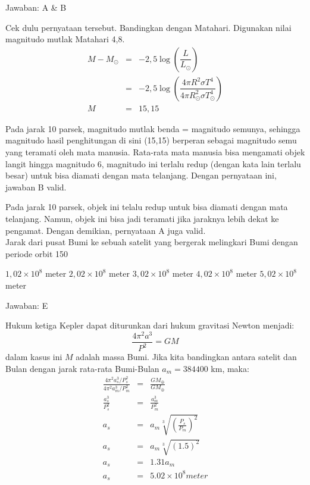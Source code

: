 \documentclass[11pt,fleqn]{exam}
\begin{document}
\begin{questions}
Jawaban: A \& B

Cek dulu pernyataan tersebut. Bandingkan dengan Matahari. Digunakan nilai magnitudo mutlak Matahari 4,8.\\

\begin{eqnarray*}
M-M_{\odot}&=&-2,5\log(\dfrac{L}{L_{\odot}})\\
&=&-2,5\log(\dfrac{4\pi R^{2}\sigma T^{4}}{4\pi R_{\odot}^{2}\sigma T_{\odot}^{4}})\\
M &=&15,15
\end{eqnarray*}

Pada jarak 10 parsek, magnitudo mutlak benda = magnitudo semunya, sehingga magnitudo hasil penghitungan di sini (15,15) berperan sebagai magnitudo semu yang teramati oleh mata manusia. Rata-rata mata manusia bisa mengamati objek langit hingga magnitudo 6, magnitudo ini terlalu redup (dengan kata lain terlalu besar) untuk bisa diamati dengan mata telanjang. Dengan pernyataan ini, jawaban B valid.

Pada jarak 10 parsek, objek ini telalu redup untuk bisa diamati dengan mata telanjang. Namun, objek ini bisa jadi teramati jika jaraknya lebih dekat ke pengamat. Dengan demikian, pernyataan A juga valid.\\


\question Jarak dari pusat Bumi ke sebuah satelit yang bergerak melingkari Bumi dengan periode orbit 150%
\begin{choices}
\choice $1,02 \times 10^{8}$ meter 
\choice $2,02 \times 10^{8}$ meter
\choice $3,02 \times 10^{8}$ meter
\choice $4,02 \times 10^{8}$ meter
\choice $5,02 \times 10^{8}$ meter
\end{choices}

Jawaban: E

Hukum ketiga Kepler dapat diturunkan dari hukum gravitasi Newton menjadi:\\
\begin{equation*}
\frac{4 \pi^{2} a^{3}}{P^{2}} = GM
\end{equation*}
dalam kasus ini $M$ adalah massa Bumi. Jika kita bandingkan antara satelit dan Bulan dengan jarak rata-rata Bumi-Bulan $a_m = 384400$ km, maka:
\begin{eqnarray*}
\frac{4 \pi^{2} a_{s}^{3}/P_{s}^{2}}{4 \pi^{2} a_{m}^{3}/P_{m}^{2}} &=& \frac{GM_{\oplus}}{GM_{\oplus}}\\
\frac{a_{s}^{3}}{P_{s}^{2}} &=& \frac{a_{m}^{3}}{P_{m}^{2}}\\
a_{s} &=& a_{m}  \sqrt[3]{\left( \frac{P_{s}}{P_{m}}\right)^{2}} \\
a_{s} &=& a_{m}  \sqrt[3]{\left(1.5\right)^{2}} \\
a_{s} &=& 1.31 a_{m}\\
a_{s} &=& 5.02 \times 10^{8} meter
\end{eqnarray*}


\end{questions}
\end{document}
